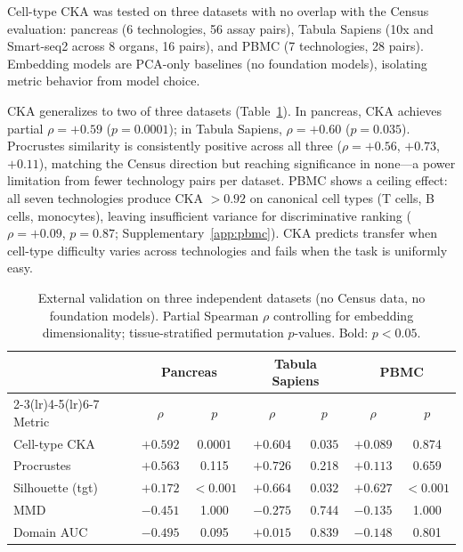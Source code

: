 \documentclass[11pt]{article}
\begin{document}
Cell-type CKA was tested on three datasets with no overlap with the
Census evaluation: pancreas \citep{luecken2022scib} (6 technologies, 56
assay pairs), Tabula Sapiens \citep{tabulasapiens2022} (10x and
Smart-seq2 across 8 organs, 16 pairs), and PBMC \citep{ding2020systematic}
(7 technologies, 28 pairs). Embedding models are PCA-only baselines (no
foundation models), isolating metric behavior from model choice.

CKA generalizes to two of three datasets
(Table~\ref{tab:external}). In pancreas, CKA achieves partial
$\rho = +0.59$ ($p = 0.0001$); in Tabula Sapiens, $\rho = +0.60$
($p = 0.035$). Procrustes similarity is consistently positive across all
three ($\rho = +0.56$, $+0.73$, $+0.11$), matching the Census direction
but reaching significance in none---a power limitation from fewer
technology pairs per dataset. PBMC shows a ceiling effect: all seven
technologies produce CKA $> 0.92$ on canonical cell types (T cells, B
cells, monocytes), leaving insufficient variance for discriminative
ranking ($\rho = +0.09$, $p = 0.87$; Supplementary~\ref{app:pbmc}). CKA
predicts transfer when cell-type difficulty varies across technologies
and fails when the task is uniformly easy.

\begin{table}[t]
\centering
\caption{External validation on three independent datasets (no Census
data, no foundation models). Partial Spearman $\rho$ controlling for
embedding dimensionality; tissue-stratified permutation $p$-values.
Bold: $p < 0.05$.}
\label{tab:external}
\small
\begin{tabular}{@{}lcccccc@{}}
\toprule
& \multicolumn{2}{c}{Pancreas} & \multicolumn{2}{c}{Tabula Sapiens} & \multicolumn{2}{c}{PBMC} \\
\cmidrule(lr){2-3}\cmidrule(lr){4-5}\cmidrule(lr){6-7}
Metric & $\rho$ & $p$ & $\rho$ & $p$ & $\rho$ & $p$ \\
\midrule
Cell-type CKA & $+0.592$ & $\mathbf{0.0001}$ & $+0.604$ & $\mathbf{0.035}$ & $+0.089$ & 0.874 \\
Procrustes    & $+0.563$ & 0.115              & $+0.726$ & 0.218             & $+0.113$ & 0.659 \\
\midrule
Silhouette (tgt) & $+0.172$ & $\mathbf{<0.001}$ & $+0.664$ & $\mathbf{0.032}$ & $+0.627$ & $\mathbf{<0.001}$ \\
MMD              & $-0.451$ & 1.000              & $-0.275$ & 0.744             & $-0.135$ & 1.000 \\
Domain AUC       & $-0.495$ & 0.095              & $+0.015$ & 0.839             & $-0.148$ & 0.801 \\
\bottomrule
\end{tabular}
\end{table}
\end{document}
